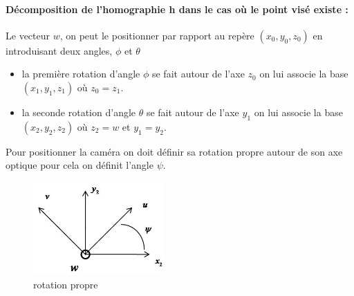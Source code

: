 \paragraph{Décomposition de l'homographie h dans le cas où le point visé existe :}
Le vecteur $w$, on peut le positionner par rapport au repère $(x_{0},y_{0},z_{0}) $ en introduisant deux angles, $\phi$ et $\theta$
\begin{itemize}
\item la première rotation d'angle $\phi$ se fait autour de l'axe $z_{0}$ on lui associe la base $(x_{1},y_{1},z_{1})$ où $z_{0}=z_{1}$.
\item la seconde rotation d'angle $\theta$ se fait autour de l'axe $y_{1}$ on lui associe la base $(x_{2},y_{2},z_{2})$ où $z_{2}=w$ et $y_{1}=y_{2}$.
\end{itemize}
\begin{figure}[h!]
\centering
{}

\end{figure}
Pour positionner la caméra on doit définir sa rotation propre autour de son axe optique pour cela on définit l'angle $\psi$.\\
\begin{figure}[h!]
\centering
\includegraphics[width=5cm]{graphe3.jpg}
\caption{rotation propre}
\end{figure}
